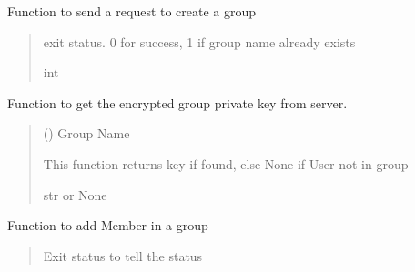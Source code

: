 \documentclass[letterpaper,10pt,english]{sphinxmanual}
\begin{document}
\begin{fulllineitems}

\begin{fulllineitems}
\label{\detokenize{Message:Message.Message._create_grp}}
\pysigstartsignatures
{}
\pysigstopsignatures
\sphinxAtStartPar
Function to send a request to create a group
\begin{quote}\begin{description}
\sphinxAtStartPar
exit status. 0 for success, 1 if group name already exists

\sphinxAtStartPar
int

\end{description}\end{quote}

\end{fulllineitems}


\begin{fulllineitems}
\label{\detokenize{Message:Message.Message._get_group_key}}
\pysigstartsignatures
{}
\pysigstopsignatures
\sphinxAtStartPar
Function to get the encrypted group private key from server.
\begin{quote}\begin{description}
\sphinxAtStartPar
{} () \textendash{} Group Name

\sphinxAtStartPar
This function returns key if found, else None if User not in group

\sphinxAtStartPar
str or None

\end{description}\end{quote}

\end{fulllineitems}


\begin{fulllineitems}
\label{\detokenize{Message:Message.Message._add_member_in_group}}
\pysigstartsignatures
{}
\pysigstopsignatures
\sphinxAtStartPar
Function to add Member in a group
\begin{quote}\begin{description}
\sphinxAtStartPar
Exit status to tell the status


\end{description}
\end{quote}
\end{fulllineitems}
\end{fulllineitems}
\end{document}
